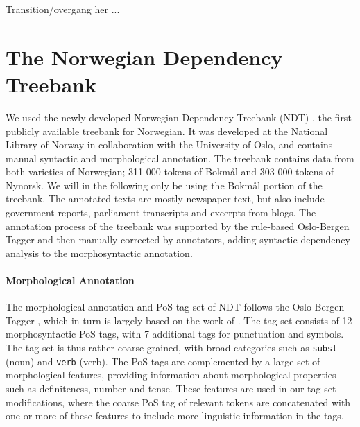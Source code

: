 \documentclass[11pt,a4paper]{article}
\begin{document}
Transition/overgang her ...

\section{The Norwegian Dependency Treebank}
\label{sec:data}
We used the newly developed Norwegian Dependency Treebank (NDT)
\cite{Sol:Skj:Ovr:14}, the first publicly available treebank for
Norwegian. It was developed at the National Library of Norway in
collaboration with the University of Oslo, and contains manual
syntactic and morphological annotation.  The treebank contains data
from both varieties of Norwegian; 311 000 tokens of Bokmål and 303 000
tokens of Nynorsk. We will in the following only be using the Bokmål
portion of the treebank. The annotated texts are mostly newspaper
text, but also include government reports, parliament transcripts and
excerpts from blogs. The annotation process of the treebank was
supported by the rule-based Oslo-Bergen Tagger \cite{Hag:Joh:Nok:00}
and then manually corrected by annotators, adding syntactic dependency analysis
to the morphosyntactic annotation.


\paragraph{Morphological Annotation}
The morphological annotation and PoS tag set of NDT follows the Oslo-Bergen
Tagger \cite{Hag:Joh:Nok:00,Sol:13}, which in turn is largely based on the work
of . The tag set consists of 12 morphosyntactic PoS
tags, with 7 additional tags for punctuation and symbols.  The tag set is thus
rather coarse-grained, with broad categories such as \texttt{subst} (noun) and
\texttt{verb} (verb). The PoS tags are complemented by a large set of
morphological features, providing information about morphological properties such as
definiteness, number and tense. These features are used in our tag set
modifications, where the coarse PoS tag of relevant tokens are concatenated
with one or more of these features to include more linguistic information in
the tags.
\end{document}
